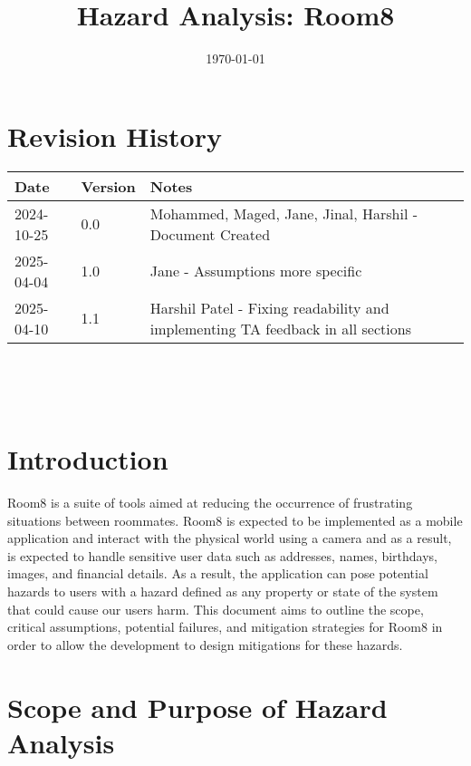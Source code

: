 \documentclass[12pt, titlepage]{article}
\begin{document}
\title{Hazard Analysis: Room8} 
\author{\authname}
\date{\today}
	
\maketitle


\section{Revision History}

\begin{tabularx}{\textwidth}{p{3cm}p{2cm}X}
\toprule {\bf Date} & {\bf Version} & {\bf Notes}\\
\midrule
    2024-10-25 & 0.0 & Mohammed, Maged, Jane, Jinal, Harshil - Document Created \\
    \midrule
    2025-04-04 & 1.0 & Jane - Assumptions more specific \\
    \midrule
    2025-04-10 & 1.1 & Harshil Patel - Fixing readability and implementing TA feedback in all sections\\
\bottomrule
\end{tabularx}

~\newpage


\tableofcontents

~\newpage


\section{Introduction}

Room8 is a suite of tools aimed at reducing the occurrence of frustrating situations between roommates. Room8 is expected to be implemented as a mobile application and interact with the physical world using a camera and as a result, is expected to handle sensitive user data such as addresses, names, birthdays, images, and financial details. As a result, the application can pose potential hazards to users with a hazard defined as any property or state of the system that could cause our users harm. This document aims to outline the scope, critical assumptions, potential failures, and mitigation strategies for Room8 in order to allow the development to design mitigations for these hazards.


\section{Scope and Purpose of Hazard Analysis}
\end{document}
